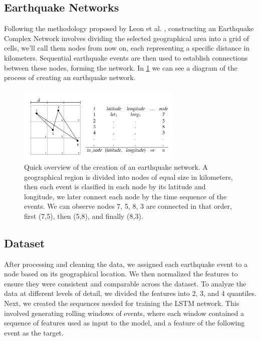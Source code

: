 \documentclass[sn-mathphys-num]{sn-jnl}
\begin{document}
\subsection{Earthquake Networks}\label{earthquake_networks}
Following the methodology proposed by Leon et al. \cite{leon_modeling_2018}, constructing an Earthquake Complex Network involves dividing the selected geographical area into a grid of cells, we'll call them nodes from now on, each representing a specific distance in kilometers. Sequential earthquake events are then used to establish connections between these nodes, forming the network. In \ref{fig2} we can see a diagram of the process of creating an earthquake network.

\begin{figure}[H]
    \begin{center}
        \includegraphics[width=0.7\textwidth]{img/diagram-20250202.png}
        \caption{Quick overview of the creation of an earthquake network. A geographical region is divided into nodes of equal size in kilometers, then each event is clasified in each node by its latitude and longitude, we later connect each node by the time sequence of the events. We can observe nodes 7, 5, 8, 3 are connected in that order, first (7,5), then (5,8), and finally (8,3).
        } \label{fig2}
    \end{center}
\end{figure}
\unskip

\subsection{Dataset}\label{dataset}
After processing and cleaning the data, we assigned each earthquake event to a node based on its geographical location. We then normalized the features to ensure they were consistent and comparable across the dataset. To analyze the data at different levels of detail, we divided the features into 2, 3, and 4 quantiles. Next, we created the sequences needed for training the LSTM network. This involved generating rolling windows of events, where each window contained a sequence of features used as input to the model, and a feature of the following event as the target.
\end{document}

